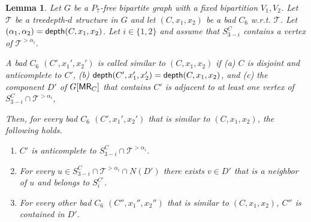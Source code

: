 \documentclass[11pt,a4paper]{article}
\newtheorem{lemma}[theorem]{Lemma}
\theoremstyle{definition}
\def\T{\mathcal{T}}
\begin{document}
\begin{lemma}\label{lem:bip-MR-nextC}
Let $G$ be a $P_7$-free bipartite graph with a fixed bipartition $V_1,V_2$.
Let $\T$ be a treedepth-$d$ structure in $G$ and let $(C,x_1,x_2)$ be a bad $C_6$ w.r.t. $\T$.
Let $(\alpha_1,\alpha_2) = \mathsf{depth}(C,x_1,x_2)$.
Let $i \in \{1,2\}$ and assume that $S^C_{3-i}$ contains a vertex of $\T^{> \alpha_i}$.

A bad $C_6$ $(C',x_1',x_2')$ is called \emph{similar to $(C,x_1,x_2)$}
if (a) $C$ is disjoint and anticomplete to $C'$, (b) $\mathsf{depth}(C',x_1',x_2') = \mathsf{depth}(C,x_1,x_2)$, 
and (c) the component $D'$ of $G[\mathsf{MR}_C]$ that
contains $C'$ is adjacent to at least one vertex of $S^C_{3-i} \cap \T^{> \alpha_i}$,

Then, for every bad $C_6$ $(C',x_1',x_2')$ that is similar to $(C,x_1,x_2)$,
the following holds.
\begin{enumerate}
    \item $C'$ is anticomplete to $S^C_{3-i} \cap \T^{> \alpha_i}$.
    \item For every $u \in S^C_{3-i} \cap \T^{> \alpha_i} \cap N(D')$
    there exists $v \in D'$ that is a neighbor of $u$ and belongs to $S^{C'}_{i}$.
    \item For every other bad $C_6$ $(C'',x_1'',x_2'')$ that is similar to $(C,x_1,x_2)$,
    $C''$ is contained in $D'$.
\end{enumerate}
\end{lemma}
\end{document}
